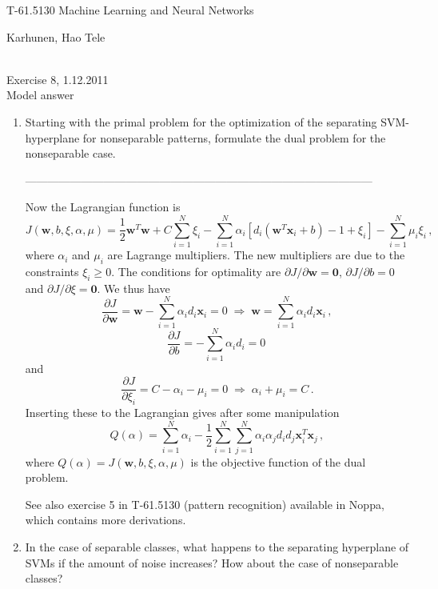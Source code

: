 \documentclass[10pt]{article}
\renewcommand{\vec}[1]{\mathbf{#1}}
\newcommand{\w}{\vec{w}}
\newcommand{\x}{\vec{x}}
\begin{document}
\pagestyle{empty}
\begin{Large}
\begin{bf} 
T-61.5130 Machine Learning and Neural Networks\\ 
\end{bf}
\end{Large}
Karhunen, Hao Tele\\  
\\
\begin{large}
\begin{bf}
Exercise 8,  1.12.2011\\Model answer
\end{bf}
\end{large}
\begin{enumerate}

\item Starting with the primal problem for the optimization of the
  separating SVM-hyperplane for nonseparable patterns, formulate the
  dual problem for the nonseparable case.

---------------------------------------------------------------------------------------------

Now the Lagrangian function is $$J(\w, b, \xi, \alpha, \mu) =
  \frac{1}{2}\w^T\w + C \sum_{i=1}^N \xi_i - \sum_{i=1}^N
  \alpha_i[d_i(\w^T \x_i + b) - 1 + \xi_i] - \sum_{i=1}^N \mu_i \xi_i
  \, ,$$ where $\alpha_i$ and $\mu_i$ are Lagrange multipliers.  The
  new multipliers are due to the constraints $\xi_i \geq 0$.  The
  conditions for optimality are $\partial J/\partial \w = \vec{0}$,
  $\partial J/\partial b = 0$ and $\partial J/\partial \xi = \vec{0}$.
  We thus have $$\frac{\partial J}{\partial \w} = \w - \sum_{i=1}^N
  \alpha_i d_i \x_i = 0 \; \Rightarrow \; \w = \sum_{i=1}^N \alpha_i
  d_i \x_i \, ,$$ $$\frac{\partial J}{\partial b} = - \sum_{i=1}^N
  \alpha_i d_i = 0 \,$$ and $$\frac{\partial J}{\partial \xi_i} = C -
  \alpha_i - \mu_i = 0 \; \Rightarrow \; \alpha_i + \mu_i = C \, .$$
  Inserting these to the Lagrangian gives after some manipulation
  $$Q(\alpha) = \sum_{i=1}^N \alpha_i - \frac{1}{2} \sum_{i=1}^N
  \sum_{j=1}^N \alpha_i \alpha_j d_i d_j \x_i^T \x_j \, ,$$ where
  $Q(\alpha) = J(\w, b, \xi, \alpha, \mu)$ is the objective function
  of the dual problem.

See also exercise 5 in T-61.5130 (pattern recognition) available in Noppa, which contains more derivations.

\vspace{2mm}

\vspace{2cm}
\item In the case of separable classes, what happens to the separating
hyperplane of SVMs if the amount of noise increases? How about the
case of nonseparable classes?


\end{enumerate}
\end{document}
